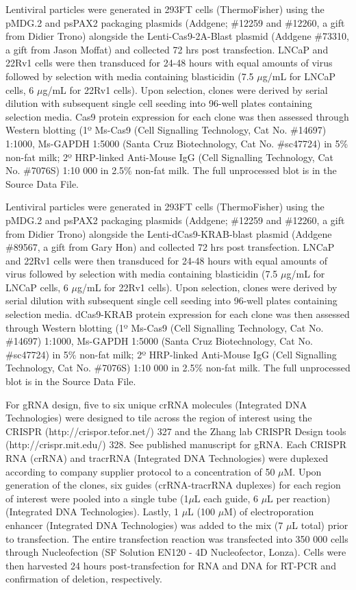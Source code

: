 Lentiviral particles were generated in 293FT cells (ThermoFisher) using the pMDG.2 and psPAX2 packaging plasmids (Addgene; \#12259 and \#12260, a gift from Didier Trono) alongside the Lenti-Cas9-2A-Blast plasmid (Addgene \#73310, a gift from Jason Moffat) and collected 72 hrs post transfection.
LNCaP and 22Rv1 cells were then transduced for 24-48 hours with equal amounts of virus followed by selection with media containing blasticidin (7.5 $\mu$g/mL for LNCaP cells, 6 $\mu$g/mL for 22Rv1 cells).
Upon selection, clones were derived by serial dilution with subsequent single cell seeding into 96-well plates containing selection media.
Cas9 protein expression for each clone was then assessed through Western blotting (1º Ms-Cas9 (Cell Signalling Technology, Cat No. \#14697) 1:1000, Ms-GAPDH 1:5000 (Santa Cruz Biotechnology, Cat No. \#sc47724) in 5\% non-fat milk; 2º HRP-linked Anti-Mouse IgG (Cell Signalling Technology, Cat No. \#7076S) 1:10 000 in 2.5\% non-fat milk.
The full unprocessed blot is in the Source Data File.

Lentiviral particles were generated in 293FT cells (ThermoFisher) using the pMDG.2 and psPAX2 packaging plasmids (Addgene; \#12259 and \#12260, a gift from Didier Trono) alongside the Lenti-dCas9-KRAB-blast plasmid (Addgene \#89567, a gift from Gary Hon) and collected 72 hrs post transfection.
LNCaP and 22Rv1 cells were then transduced for 24-48 hours with equal amounts of virus followed by selection with media containing blasticidin (7.5 $\mu$g/mL for LNCaP cells, 6 $\mu$g/mL for 22Rv1 cells).
Upon selection, clones were derived by serial dilution with subsequent single cell seeding into 96-well plates containing selection media.
dCas9-KRAB protein expression for each clone was then assessed through Western blotting (1º Ms-Cas9 (Cell Signalling Technology, Cat No. \#14697) 1:1000, Ms-GAPDH 1:5000 (Santa Cruz Biotechnology, Cat No. \#sc47724) in 5\% non-fat milk; 2º HRP-linked Anti-Mouse IgG (Cell Signalling Technology, Cat No. \#7076S) 1:10 000 in 2.5\% non-fat milk.
The full unprocessed blot is in the Source Data File.

For gRNA design, five to six unique crRNA molecules (Integrated DNA Technologies) were designed to tile across the region of interest using the CRISPR (http://crispor.tefor.net/) 327 and the Zhang lab CRISPR Design tools (http://crispr.mit.edu/) 328.
See published manuscript for gRNA.
Each CRISPR RNA (crRNA) and tracrRNA (Integrated DNA Technologies) were duplexed according to company supplier protocol to a concentration of 50 $\mu$M.
Upon generation of the clones, six guides (crRNA-tracrRNA duplexes) for each region of interest were pooled into a single tube (1$\mu$L each guide, 6 $\mu$L per reaction) (Integrated DNA Technologies).
Lastly, 1 $\mu$L (100 $\mu$M) of electroporation enhancer (Integrated DNA Technologies) was added to the mix (7 $\mu$L total) prior to transfection.
The entire transfection reaction was transfected into 350 000 cells through Nucleofection (SF Solution EN120 - 4D Nucleofector, Lonza).
Cells were then harvested 24 hours post-transfection for RNA and DNA for RT-PCR and confirmation of deletion, respectively.


